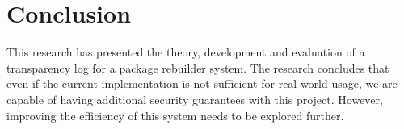 \documentclass[../Main/thesis.tex]{subfiles}
\begin{document}
\section{Conclusion}%
\label{sec:conclusion_conclusion}
This research has presented the theory, development and evaluation of a
transparency log for a package rebuilder system. The research concludes that
even if the current implementation is not sufficient for real-world usage, we
are capable of having additional security guarantees with this project. However,
improving the efficiency of this system needs to be explored further.
\end{document}
